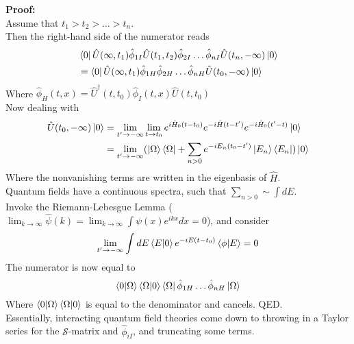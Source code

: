 \noindent \textbf{Proof:} \\
\noindent Assume that $t_1>t_2>\dots>t_n$. \\
\noindent Then the right-hand side of the numerator reads
\begin{align}
&\bra{0} \hat{U}(\infty,t_1) \hat{\phi}_{1I} \hat{U}(t_1,t_2) \hat{\phi}_{2I} \dots \hat{\phi}_{nI} \hat{U}(t_n,-\infty) \ket{0} \\
&= \bra{0} \hat{U}(\infty,t_1) \hat{\phi}_{1H} \hat{\phi}_{2H} \dots \hat{\phi}_{nH} \hat{U}(t_0,-\infty) \ket{0}
\end{align}
\noindent Where $\hat{\phi}_H(t,x) = \hat{U}^\dagger(t,t_0) \hat{\phi}_I(t,x) \hat{U}(t,t_0)$ \\
\noindent Now dealing with 
\begin{align}
\hat{U}(t_0,-\infty) \ket{0} &= \lim_{t'\to -\infty} \lim_{t \to t_0} e^{i \hat{H}_0(t-t_0)} e^{-i \hat{H}(t-t')} e^{-i \hat{H}_0(t'-t)} \ket{0} \\
&= \lim_{t' \to -\infty} (\ket{\Omega}\bra{\Omega} + \sum_{n>0} e^{-i E_n (t_0 - t')} \ket{E_n}\bra{E_n})\ket{0}
\end{align}
\noindent Where the nonvanishing terms are written in the eigenbasis of $\hat{H}$. \\
\noindent Quantum fields have a continuous spectra, such that $\sum_{n>0} \sim \int dE$. \\
\noindent Invoke the Riemann-Lebesgue Lemma ($\lim_{k\to\infty} \hat{\psi}(k) = \lim_{k\to\infty} \int \psi(x)e^{ikx} dx = 0$), and consider
\begin{equation}
\lim_{t' \to -\infty} \int dE \braket{E|0} e^{-iE(t-t_0)} \braket{\phi|E} = 0
\end{equation}
\noindent The numerator is now equal to 
\begin{equation}
\braket{0|\Omega}\braket{\Omega|0}\bra{\Omega}\hat{\phi}_{1H}\dots\hat{\phi}_{nH}\ket{\Omega}
\end{equation}
\noindent Where $\braket{0|\Omega}\braket{\Omega|0}$ is equal to the denominator and cancels. QED.\\

\noindent Essentially, interacting quantum field theories come down to throwing in a Taylor series for the $\mathcal{S}$-matrix and $\hat{\phi}_{iI}$, and truncating some terms.